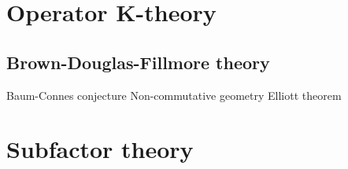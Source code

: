\documentclass{../note}
\begin{document}
\part{Operator K-theory}
\chapter{Brown-Douglas-Fillmore theory}
\begin{prb}
\end{prb}

Baum-Connes conjecture
Non-commutative geometry
Elliott theorem














\part{Subfactor theory}
\end{document}
